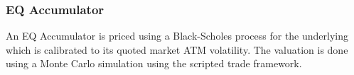 \subsubsection{EQ Accumulator}
\label{pricing:eq_accumulator}

An EQ Accumulator is priced using a Black-Scholes process for the underlying which is calibrated to its
quoted market ATM volatility. The valuation is done using a Monte Carlo simulation using the scripted trade framework.


